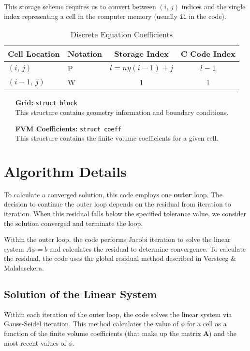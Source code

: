 \documentclass{article}
\newcommand{\lp}{\left(}
\newcommand{\rp}{\right)}
\begin{document}
This storage scheme requires us to convert between $(i,\,j)$ indices and the single index representing a cell in the computer memory (usually \texttt{ii} in the code).

\begin{table}[!ht]
\caption{Discrete Equation Coefficients}
\centering
\begin{tabular}{l|l|c|c} 
   Cell Location & Notation & Storage Index           & C Code Index\footnotemark \\\hline
   $(i,\,j)$     & P        & $l = ny\lp i-1 \rp + j$ & $l - 1$ \\ \hline
   $(i-1,\,j)$   & W        & 1 & 1
\end{tabular}
\label{tab:idx_conv}
\end{table}


\begin{itemize}
    \item[\textbf{Grid:}] \texttt{struct block}\\ This structure contains geometry information and boundary conditions.
    \item[\textbf{FVM Coefficients:}] \texttt{struct coeff}\\ This structure contains the finite volume coefficients for a given cell.
    
\end{itemize}


\section{Algorithm Details}

To calculate a converged solution, this code employs one \textbf{outer} loop. The decision to continue the outer loop depends on the residual from iteration to iteration. When this residual falls below the specified tolerance value, we consider the solution converged and terminate the loop. 

Within the outer loop, the code performs Jacobi iteration to solve the linear system $A\phi = b$ and calculates the residual to determine convergence. To calculate the residual, the code uses the global residual method described in Versteeg \& Malalasekera.

\subsection{Solution of the Linear System}
Within each iteration of the outer loop, the code solves the linear system via Gauss-Seidel iteration. This method calculates the value of $\phi$ for a cell as a function of the finite volume coefficients (that make up the matrix $\mathbf{A}$) and the most recent values of $\phi$. 
\end{document}
